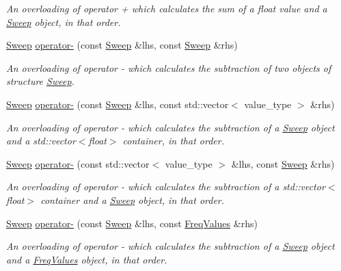 \begin{DoxyCompactItemize}
\begin{DoxyCompactList}\small\item\em An overloading of operator + which calculates the sum of a {\itshape float} value and a {\itshape \hyperlink{structSweep}{Sweep}} object, in that order. \end{DoxyCompactList}\item 
\hyperlink{structSweep}{Sweep} \hyperlink{structSweep_a8f704b31d015e4d81d25d3fceca1e2f1}{operator-\/} (const \hyperlink{structSweep}{Sweep} \&lhs, const \hyperlink{structSweep}{Sweep} \&rhs)
\begin{DoxyCompactList}\small\item\em An overloading of operator -\/ which calculates the subtraction of two objects of structure {\itshape \hyperlink{structSweep}{Sweep}}. \end{DoxyCompactList}\item 
\mbox{\label{structSweep_a8602fc01989959a0dfa663119e733869}} 
\hyperlink{structSweep}{Sweep} \hyperlink{structSweep_a8602fc01989959a0dfa663119e733869}{operator-\/} (const \hyperlink{structSweep}{Sweep} \&lhs, const std\+::vector$<$ value\+\_\+type $>$ \&rhs)
\begin{DoxyCompactList}\small\item\em An overloading of operator -\/ which calculates the subtraction of a {\itshape \hyperlink{structSweep}{Sweep}} object and a {\ttfamily std\+::vector$<$float$>$} container, in that order. \end{DoxyCompactList}\item 
\mbox{\label{structSweep_a2945ea8ce526d683db507a783acc2662}} 
\hyperlink{structSweep}{Sweep} \hyperlink{structSweep_a2945ea8ce526d683db507a783acc2662}{operator-\/} (const std\+::vector$<$ value\+\_\+type $>$ \&lhs, const \hyperlink{structSweep}{Sweep} \&rhs)
\begin{DoxyCompactList}\small\item\em An overloading of operator -\/ which calculates the subtraction of a {\ttfamily std\+::vector$<$float$>$} container and a {\itshape \hyperlink{structSweep}{Sweep}} object, in that order. \end{DoxyCompactList}\item 
\hyperlink{structSweep}{Sweep} \hyperlink{structSweep_a124ea929f6dba249bd4d6bf5476ab621}{operator-\/} (const \hyperlink{structSweep}{Sweep} \&lhs, const \hyperlink{structFreqValues}{Freq\+Values} \&rhs)
\begin{DoxyCompactList}\small\item\em An overloading of operator -\/ which calculates the subtraction of a {\itshape \hyperlink{structSweep}{Sweep}} object and a {\itshape \hyperlink{structFreqValues}{Freq\+Values}} object, in that order. \end{DoxyCompactList}\item 

\end{DoxyCompactItemize}
